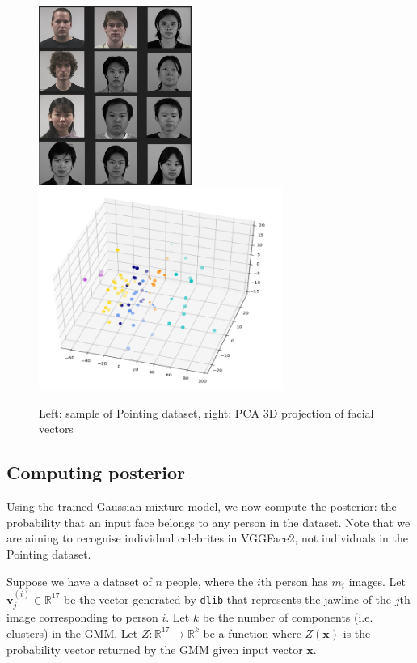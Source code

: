 \documentclass{article}
\begin{document}
\begin{figure}[ht]
  \centering
  \includegraphics[width=5cm]{images/frontal_sample.png}
  \includegraphics[width=8cm]{images/broad_pca.png}
  \caption{Left: sample of Pointing dataset, right: PCA 3D
  projection of facial vectors}
  \label{fig:broad_sample}
\end{figure}

\subsection{Computing posterior}

Using the trained Gaussian mixture model, we now compute the posterior: the
probability that an input face belongs to any person in the dataset. Note that
we are aiming to recognise individual celebrites in VGGFace2, not individuals in
the Pointing dataset.

Suppose we have a dataset of $n$ people, where the $i$th person has $m_i$
images. Let $\mathbf{v}^{(i)}_j \in \mathbb{R}^{17}$ be the vector generated by
\texttt{dlib} that represents the jawline of the $j$th image corresponding to
person $i$. Let $k$ be the number of components (i.e. clusters) in the GMM. Let
$Z : \mathbb{R}^{17} \rightarrow \mathbb{R}^k$ be a function where
$Z(\mathbf{x})$ is the probability vector returned by the GMM given input vector
$\mathbf{x}$.
\end{document}
